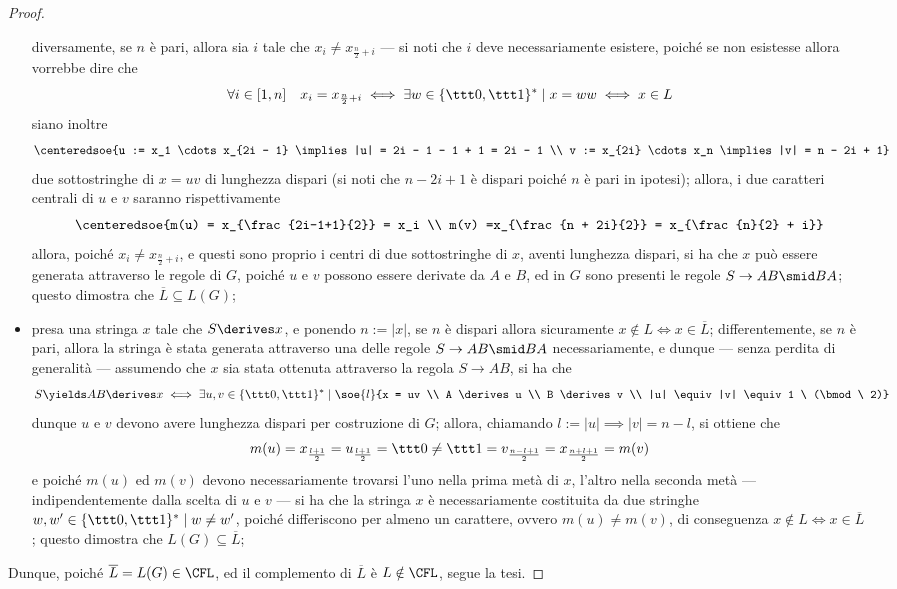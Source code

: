 \documentclass[a4paper, 12pt]{report}
\begin{document}
\begin{proof}
\begin{itemize}
                diversamente, se $n$ è pari, allora sia $i$ tale che $x_i \neq x_{\frac{n}{2} + i}$ --- si noti che $i$ deve necessariamente esistere, poiché se non esistesse allora vorrebbe dire che $$\forall i \in [1, n] \quad x_i = x_{\frac{n}{2} + i} \iff \exists w \in \{\ttt 0, \ttt 1\}^* \mid x = ww \iff x \in L$$ siano inoltre $$\centeredsoe{u := x_1 \cdots x_{2i - 1} \implies |u| = 2i - 1 - 1 + 1 = 2i - 1 \\ v := x_{2i} \cdots x_n \implies |v| = n - 2i + 1}$$ due sottostringhe di $x = uv$ di lunghezza dispari (si noti che $n - 2i + 1$ è dispari poiché $n$ è pari in ipotesi); allora, i due caratteri centrali di $u$ e $v$ saranno rispettivamente $$\centeredsoe{m(u) = x_{\frac{2i-1+1}{2}} = x_i \\ m(v) =x_{\frac{n + 2i}{2}} = x_{\frac{n}{2} + i}}$$ allora, poiché $x_i \neq x_{\frac{n}{2} + i}$, e questi sono proprio i centri di due sottostringhe di $x$, aventi lunghezza dispari, si ha che $x$ può essere generata attraverso le regole di $G$, poiché $u$ e $v$ possono essere derivate da $A$ e $B$, ed in $G$ sono presenti le regole $S \to AB \smid BA$; questo dimostra che $\overline L \subseteq L(G)$;
            \item presa una stringa $x$ tale che $S \derives x$, e ponendo $n := |x|$, se $n$ è dispari allora sicuramente $x \notin L \iff x \in \overline L$; differentemente, se $n$ è pari, allora la stringa è stata generata attraverso una delle regole $S \to AB \smid BA$ necessariamente, e dunque --- senza perdita di generalità --- assumendo che $x$ sia stata ottenuta attraverso la regola $S \to AB$, si ha che $$S \yields AB \derives x \iff \exists u, v \in \{\ttt 0 , \ttt 1\}^* \mid \soe{l}{x = uv \\ A \derives u \\ B \derives v \\ |u| \equiv |v| \equiv 1 \ (\bmod \ 2)}$$ dunque $u$ e $v$ devono avere lunghezza dispari per costruzione di $G$; allora, chiamando $l := |u| \implies |v| = n - l$, si ottiene che $$m (u) = x_{\frac{l + 1}{2}} = u_{\frac{l + 1}{2}} = \ttt 0 \neq \ttt 1 = v_{\frac{n - l + 1}{2}} = x_{\frac{n + l + 1}{2}} = m(v)$$ e poiché $m(u)$ ed $m(v)$ devono necessariamente trovarsi l'uno nella prima metà di $x$, l'altro nella seconda metà --- indipendentemente dalla scelta di $u$ e $v$ --- si ha che la stringa $x$ è necessariamente costituita da due stringhe $w, w' \in \{\ttt 0, \ttt 1\}^* \mid w \neq w'$, poiché differiscono per almeno un carattere, ovvero $m(u) \neq m(v)$, di conseguenza $x \notin L \iff x \in \overline L$; questo dimostra che $L(G) \subseteq \overline L$;
        \end{itemize}

        Dunque, poiché $\overline L = L(G) \in \CFL$, ed il complemento di $\overline L$ è $L \notin \CFL$, segue la tesi.
    \end{proof}
 
\end{document}

